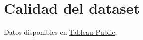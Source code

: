 \documentclass{article}
\begin{document}
%






\clearpage

\appendix


\section{Calidad del dataset} \label{anexo:I}

Datos disponibles en \href{https://public.tableau.com/profile/javier6580\#!/vizhome/proyecto_fin_de_master_dataset/dataset_quality}{Tableau Public}:
\end{document}
